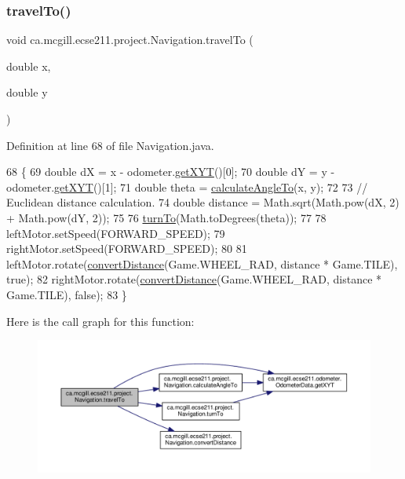 \subsubsection{\texorpdfstring{travel\+To()}{travelTo()}}
{\footnotesize\ttfamily void ca.\+mcgill.\+ecse211.\+project.\+Navigation.\+travel\+To (\begin{DoxyParamCaption}\item[{double}]{x,  }\item[{double}]{y }\end{DoxyParamCaption})}



Definition at line 68 of file Navigation.\+java.


\begin{DoxyCode}
68                                            \{
69     \textcolor{keywordtype}{double} dX = x - odometer.\hyperlink{classca_1_1mcgill_1_1ecse211_1_1odometer_1_1_odometer_data_a8f40f0264c68f0cbed4fff1723ae7863}{getXYT}()[0];
70     \textcolor{keywordtype}{double} dY = y - odometer.\hyperlink{classca_1_1mcgill_1_1ecse211_1_1odometer_1_1_odometer_data_a8f40f0264c68f0cbed4fff1723ae7863}{getXYT}()[1];
71     \textcolor{keywordtype}{double} theta = \hyperlink{classca_1_1mcgill_1_1ecse211_1_1project_1_1_navigation_a4376e54162df8f123ca3b52e4fd2f38d}{calculateAngleTo}(x, y);
72 
73     \textcolor{comment}{// Euclidean distance calculation.}
74     \textcolor{keywordtype}{double} distance = Math.sqrt(Math.pow(dX, 2) + Math.pow(dY, 2));
75 
76     \hyperlink{classca_1_1mcgill_1_1ecse211_1_1project_1_1_navigation_a3bbe0645f2b3b3d0986b4a707fb5a00c}{turnTo}(Math.toDegrees(theta));
77 
78     leftMotor.setSpeed(FORWARD\_SPEED);
79     rightMotor.setSpeed(FORWARD\_SPEED);
80 
81     leftMotor.rotate(\hyperlink{classca_1_1mcgill_1_1ecse211_1_1project_1_1_navigation_ac9e260bcd619ffa4820d7d0de7ea1c12}{convertDistance}(Game.WHEEL\_RAD, distance * Game.TILE), \textcolor{keyword}{true});
82     rightMotor.rotate(\hyperlink{classca_1_1mcgill_1_1ecse211_1_1project_1_1_navigation_ac9e260bcd619ffa4820d7d0de7ea1c12}{convertDistance}(Game.WHEEL\_RAD, distance * Game.TILE), \textcolor{keyword}{false});
83   \}
\end{DoxyCode}
Here is the call graph for this function\+:
\nopagebreak
\begin{figure}[H]
\begin{center}
\leavevmode
\includegraphics[width=350pt]{classca_1_1mcgill_1_1ecse211_1_1project_1_1_navigation_ad89b3dd084d81b4ec4d89ea73ba13eaa_cgraph}
\end{center}
\end{figure}
